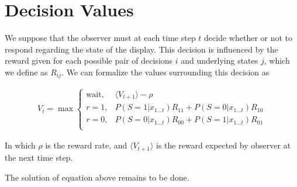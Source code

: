 \documentclass[12pt]{article}
\begin{document}
\section{Decision Values}
We suppose that the observer must at each time step $t$ decide whether or not to respond regarding the state of the display. This decision is influenced by the reward given for each possible pair of decisions $i$ and underlying states $j$, which we define as $R_{ij}$. We can formalize the values surrounding this decision as

\begin{align}
V_t = \max
\begin{cases}
\text{wait}, & \langle V_{t+1} \rangle -\rho\\
r=1, & P(S=1 | x_{1 \dots t})R_{11} + P(S=0|x_{1 \dots t})R_{10}\\
r=0, & P(S=0 | x_{1 \dots t})R_{00} + P(S=1 | x_{1 \dots t})R_{01}\\
\end{cases}
\end{align}

In which $\rho$ is the reward rate, and $\langle V_{t+1} \rangle$ is the reward expected by observer at the next time step. 

The solution of equation above remains to be done.
\end{document}
